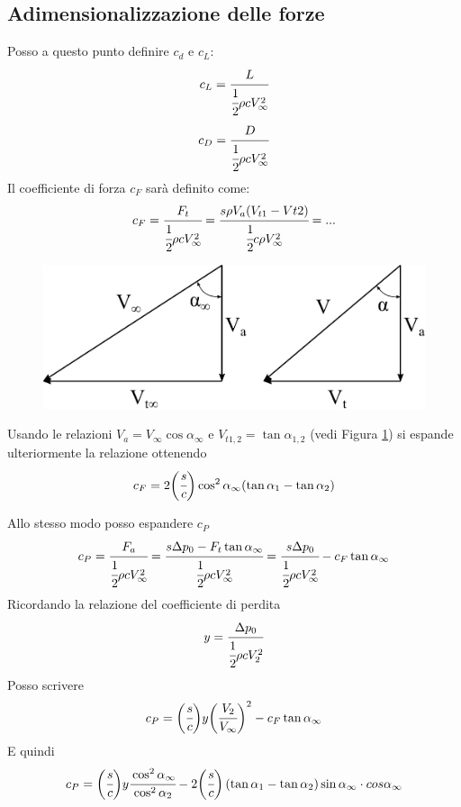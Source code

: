 \subsection{Adimensionalizzazione delle forze}
Posso a questo punto definire $c_d$ e $c_L$:
\begin{equation}
c_L = \cfrac{L}{\cfrac{1}{2} \rho c V_{\infty}^2}
\end{equation}
\begin{equation}
c_D = \cfrac{D}{\cfrac{1}{2} \rho c V_{\infty}^2}
\end{equation}
Il coefficiente di forza $c_F$ sarà definito come:
\begin{align*}
c_F = \cfrac{F_t}{\cfrac{1}{2} \rho c V_{\infty}^2} = \cfrac{s \rho V_a (V_{t1}-V{t2})}{\cfrac{1}{2} c \rho V_{\infty}^2} = ...
\end{align*}
\begin{figure}
\centering
  \includegraphics[width=.4\textwidth]{fig/trigrel.pdf}
\caption{}
\label{fig:trigrel}
\end{figure}
Usando le relazioni $V_a = V_{\infty} \cos \alpha_{\infty}$ e $V_{t1,2} = \tan \alpha_{1,2}$ (vedi Figura \ref{fig:trigrel}) si espande ulteriormente la relazione ottenendo
\begin{equation}
c_F = 2 \bigg(\cfrac{s}{c} \bigg) \cos ^ 2 \alpha_{\infty}(\tan \alpha_1 - \tan \alpha_2)
\end{equation}

Allo stesso modo posso espandere $c_P$
\begin{align*}
c_P = \cfrac{F_a}{\cfrac{1}{2} \rho c V_{\infty}^2} = \cfrac{s \Delta p_0 - F_t \tan \alpha_{\infty}}{\cfrac{1}{2} \rho c V_{\infty}^2} = \cfrac{s \Delta p_0}{\cfrac{1}{2} \rho c V_{\infty}^2} - c_F \tan \alpha_{\infty}
\end{align*}
Ricordando la relazione del coefficiente di perdita
\begin{align*}
y = \cfrac{\Delta p_0}{\cfrac{1}{2} \rho c V_2^2}
\end{align*}
Posso scrivere
\begin{align*}
c_P = \bigg(\cfrac{s}{c}\bigg)y \bigg(\cfrac{V_2}{V_{\infty}}\bigg)^2 - c_F \tan \alpha_{\infty}
\end{align*}
E quindi
\begin{align*}
c_P = \bigg(\cfrac{s}{c}\bigg)y \cfrac{\cos^2 \alpha_{\infty}}{\cos^2 \alpha_2} -2\bigg(\cfrac{s}{c}\bigg) \left(\tan \alpha_1 - \tan \alpha_2 \right) \sin \alpha_{\infty} \cdot cos \alpha_{\infty}
\end{align*}

